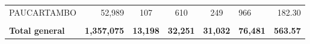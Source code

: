 \begin{tabular}{lrccclr}
	\cellcolor[HTML]{C6E0B4}PAUCARTAMBO                            & 52,989                                                         & 107                                                         & 610                  & 249                      & 966                                                                 & 182.30                                                                       \\
	& \multicolumn{1}{l}{}                                           & \multicolumn{1}{l}{}                                        & \multicolumn{1}{l}{} & \multicolumn{1}{l}{}     &                                                                     & \multicolumn{1}{l}{}                                                         \\
	\rowcolor[HTML]{DDEBF7} 
	\textbf{Total   general}                                       & \textbf{1,357,075}                                             & \multicolumn{1}{r}{\cellcolor[HTML]{DDEBF7}\textbf{13,198}} & \textbf{32,251}      & \textbf{31,032}          & \textbf{76,481}                                                     & \textbf{563.57}                                                             
\end{tabular}